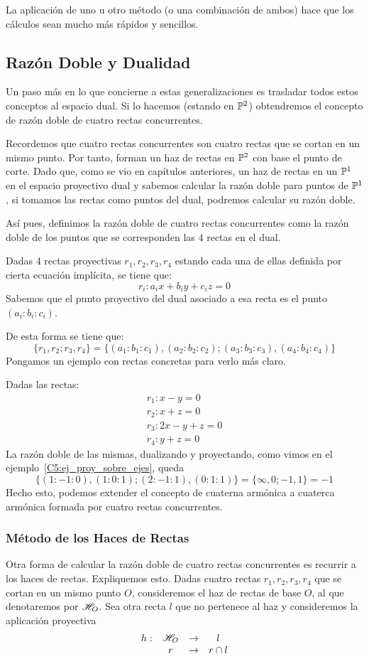 La aplicación de uno u otro método (o una combinación de ambos) hace que los cálculos sean mucho más rápidos y sencillos.
\subsection{Razón Doble y Dualidad}
Un paso más en lo que concierne a estas generalizaciones es trasladar todos estos conceptos al espacio dual. Si lo hacemos (estando en $\mathbb{P}^2$) obtendremos el concepto de razón doble de cuatro rectas concurrentes.

Recordemos que cuatro rectas concurrentes son cuatro rectas que se cortan en un mismo punto. Por tanto, forman un haz de rectas en $\mathbb{P}^2$ con base el punto de corte. Dado que, como se vio en capítulos anteriores, un haz de rectas en un $\mathbb{P}^1$ en el espacio proyectivo dual y sabemos calcular la razón doble para puntos de $\mathbb{P}^1$, si tomamos las rectas como puntos del dual, podremos calcular su razón doble.

Así pues, definimos la razón doble de cuatro rectas concurrentes como la razón doble de los puntos que se corresponden las $4$ rectas en el dual.

Dadas $4$ rectas proyectivas $r_1,r_2,r_3,r_4$ estando cada una de ellas definida por cierta ecuación implícita, se tiene que:
\[r_i:a_ix+b_iy+c_iz=0\]
Sabemos que el punto proyectivo del dual asociado a esa recta es el punto $(a_i:b_i:c_i)$.

De esta forma se tiene que:
\[\{r_1,r_2;r_3,r_4\}=\{(a_1:b_1:c_1),(a_2:b_2:c_2);(a_3:b_3:c_3),(a_4:b_4:c_4)\}\]
Pongamos un ejemplo con rectas concretas para verlo más claro.
\begin{exa}
	Dadas las rectas:
	\[\begin{array}{c}
	r_1:x-y=0\\
	r_2:x+z=0\\
	r_3:2x-y+z=0\\
	r_4:y+z=0
	\end{array}\]
	La razón doble de las mismas, dualizando y proyectando, como vimos en el ejemplo~\ref{C5:ej_proy_sobre_ejes}, queda
	\[\{(1:-1:0),(1:0:1);(2:-1:1),(0:1:1)\}=\{\infty, 0; -1,1\}=-1\]
	Hecho esto, podemos extender el concepto de cuaterna armónica a cuaterca armónica formada por cuatro rectas concurrentes.
\end{exa}
\subsubsection{Método de los Haces de Rectas}
Otra forma de calcular la razón doble de cuatro rectas concurrentes es recurrir a los haces de rectas. Expliquemos esto. Dadas cuatro rectas $r_1,r_2,r_3,r_4$ que se cortan en un mismo punto $O$, consideremos el haz de rectas de base $O$, al que denotaremos por $\mathscr{H}_O$. Sea otra recta $l$ que no pertenece al haz y consideremos la aplicación proyectiva
\[\begin{array}{cccc}
h:&\mathscr{H}_O&\rightarrow & l\\
& r&\rightarrow & r\cap l
\end{array}\]

